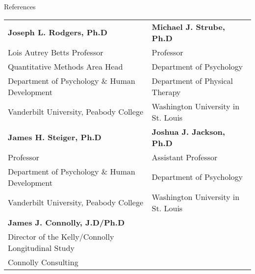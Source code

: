 \documentclass {resume}
\begin{document}
\pagebreak
\begin{samepage}\begin{rSection}{\textrm{References}}
\begin{tabular}{ l l }
\textbf{Joseph L. Rodgers, Ph.D} & \textbf{Michael J. Strube, Ph.D}\\
Lois Autrey Betts Professor & Professor\\
Quantitative Methods Area Head & Department of Psychology\\
Department of Psychology $\&$ Human Development & Department of Physical Therapy\\
Vanderbilt University, Peabody College & Washington University in St. Louis\bigskip\\

\textbf{James H. Steiger, Ph.D} & \textbf{Joshua J. Jackson, Ph.D}\\
Professor & Assistant Professor\\
Department of Psychology $\&$ Human Development & Department of Psychology\\
Vanderbilt University, Peabody College & Washington University in St. Louis\bigskip\\
\textbf{James J. Connolly, J.D/Ph.D} 
\\
Director of the Kelly/Connolly Longitudinal Study\\ 
Connolly Consulting\\
%
\end{tabular}\end{rSection}\end{samepage}
\end{document}
